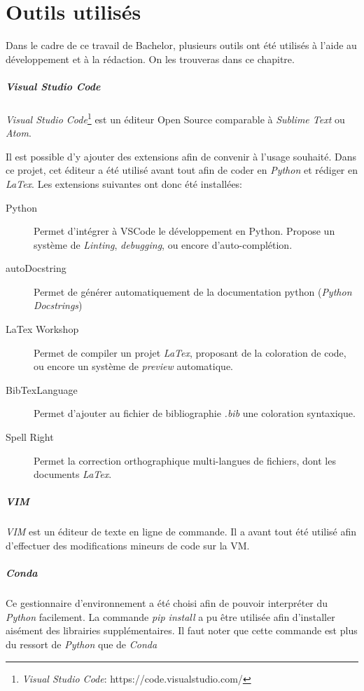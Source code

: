 \chapter*{Outils utilisés}

Dans le cadre de ce travail de Bachelor, plusieurs outils ont été utilisés à l'aide au développement et à la rédaction. On les trouveras dans ce chapitre.

\paragraph{Visual Studio Code}
\textit{Visual Studio Code}\footnote{\textit{Visual Studio Code}: https://code.visualstudio.com/} est un éditeur Open Source comparable à \textit{Sublime Text} ou \textit{Atom}. 

Il est possible d'y ajouter des extensions afin de convenir à l'usage souhaité. Dans ce projet, cet éditeur a été utilisé avant tout afin de coder en \textit{Python} et rédiger en \textit{LaTex}. Les extensions suivantes ont donc été installées:
\begin{description}
    \item[Python] Permet d'intégrer à VSCode le développement en Python. Propose un système de \textit{Linting}, \textit{debugging}, ou encore d'auto-complétion.
    \item[autoDocstring] Permet de générer automatiquement de la documentation python (\textit{Python Docstrings})
    \item[LaTex Workshop] Permet de compiler un projet \textit{LaTex}, proposant de la coloration de code, ou encore un système de \textit{preview} automatique.
    \item[BibTexLanguage] Permet d'ajouter au fichier de bibliographie \textit{.bib} une coloration syntaxique.
    \item[Spell Right] Permet la correction orthographique multi-langues de fichiers, dont les documents \textit{LaTex}.
\end{description}

\paragraph{VIM}
\textit{VIM} est un éditeur de texte en ligne de commande. Il a avant tout été utilisé afin d'effectuer des modifications mineurs de code sur la VM.

\paragraph{Conda}
Ce gestionnaire d'environnement a été choisi afin de pouvoir interpréter du \textit{Python} facilement. La commande \textit{pip install} a pu être utilisée afin d'installer aisément des librairies supplémentaires. Il faut noter que cette commande est plus du ressort de \textit{Python} que de \textit{Conda}

